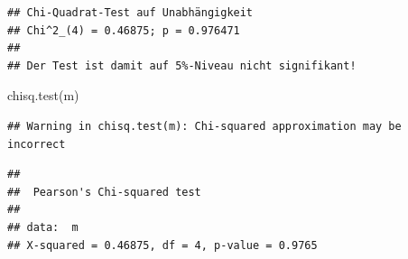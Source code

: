 \documentclass[
]{book}
\newenvironment{Shaded}{\begin{snugshade}}{\end{snugshade}}
\newcommand{\AttributeTok}[1]{\textcolor[rgb]{0.77,0.63,0.00}{#1}}
\newcommand{\ControlFlowTok}[1]{\textcolor[rgb]{0.13,0.29,0.53}{\textbf{#1}}}
\newcommand{\DecValTok}[1]{\textcolor[rgb]{0.00,0.00,0.81}{#1}}
\newcommand{\FunctionTok}[1]{\textcolor[rgb]{0.00,0.00,0.00}{#1}}
\newcommand{\NormalTok}[1]{#1}
\newcommand{\OtherTok}[1]{\textcolor[rgb]{0.56,0.35,0.01}{#1}}
\newcommand{\SpecialCharTok}[1]{\textcolor[rgb]{0.00,0.00,0.00}{#1}}
\newcommand{\StringTok}[1]{\textcolor[rgb]{0.31,0.60,0.02}{#1}}
\begin{document}
\begin{Shaded}
\end{Shaded}

\begin{verbatim}
## Chi-Quadrat-Test auf Unabhängigkeit
## Chi^2_(4) = 0.46875; p = 0.976471
## 
## Der Test ist damit auf 5%-Niveau nicht signifikant!
\end{verbatim}

\begin{Shaded}
\begin{Highlighting}[]
\FunctionTok{chisq.test}\NormalTok{(m)}
\end{Highlighting}
\end{Shaded}

\begin{verbatim}
## Warning in chisq.test(m): Chi-squared approximation may be incorrect
\end{verbatim}

\begin{verbatim}
## 
##  Pearson's Chi-squared test
## 
## data:  m
## X-squared = 0.46875, df = 4, p-value = 0.9765
\end{verbatim}

  
\end{document}
